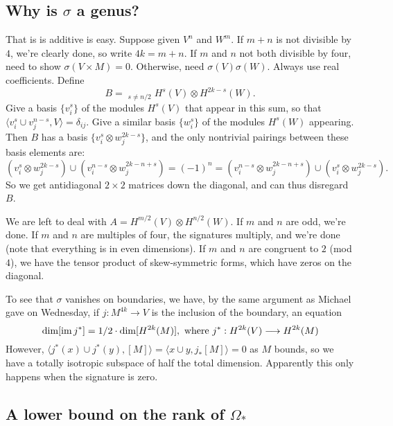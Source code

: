\documentclass[11pt]{article}
\begin{document}
\begin{SignatureThmTalk}
\subsection*{Why is $\sigma$ a genus?}
That is is additive is easy. Suppose given $V^n$ and $W^m$.
If $m+n$ is not divisible by $4$, we're clearly done, so write $4k=m+n$. If $m$ and $n$ not both divisible by four, need to show $\sigma(V\times M)=0$. Otherwise, need $\sigma(V)\sigma(W)$. Always use real coefficients. Define
\[B=\mathop{\bigoplus_{s=0}^{2k}}_{s\neq n/2}H^{s}(V)\otimes H^{2k-s}(W).\]
Give a basis $\{v_i^s\}$ of the modules $H^s(V)$ that appear in this sum, so that $\langle v_i^s\cup v_j^{n-s},V\rangle=\delta_{ij}$. Give a similar basis $\{w_i^s\}$ of the modules $H^s(W)$ appearing. Then $B$ has a basis $\{v_i^s\otimes w_j^{2k-s}\}$, and the only nontrivial pairings between these basis elements are:
\[(v_i^s\otimes w_j^{2k-s})\cup(v_i^{n-s}\otimes w_j^{2k-n+s})=(-1)^{n}=(v_i^{n-s}\otimes w_j^{2k-n+s})\cup(v_i^s\otimes w_j^{2k-s}).\]
So we get antidiagonal $2\times2$ matrices down the diagonal, and can thus disregard $B$.

We are left to deal with $A=H^{m/2}(V)\otimes H^{n/2}(W)$. If $m$ and $n$ are odd, we're done. If $m$ and $n$ are multiples of four, the signatures multiply, and we're done (note that everything is in even dimensions). If $m$ and $n$ are congruent to $2$ (mod $4$), we have the tensor product of skew-symmetric forms, which have zeros on the diagonal.

To see that $\sigma$ vanishes on boundaries, we have, by the same argument as Michael gave on Wednesday, if $j:M^{4k}\to V$ is the inclusion of the boundary, an equation 
\[\dim[\operatorname{im} j^*]=1/2\cdot\dim [H^{2k}(M)],\text{ where }j^*:H^{2k}(V)\longrightarrow H^{2k}(M)\]
However, $\langle j^*(x)\cup j^*(y),[M]\rangle=\langle x\cup y,j_*[M]\rangle=0$ as $M$ bounds, so we have a totally isotropic subspace of half the total dimension. Apparently this only happens when the signature is zero.
\pagebreak
\subsection*{A lower bound on the rank of $\Omega_*$}


\end{SignatureThmTalk}
\end{document}
